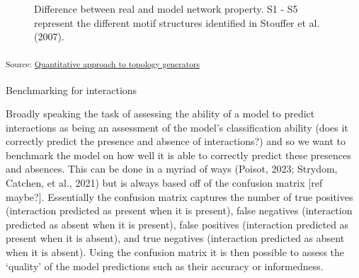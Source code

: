\documentclass[
]{article}
\makeatletter
\let\oldparagraph\paragraph
\renewcommand{\paragraph}{
    \@ifstar
      \xxxParagraphStar
      \xxxParagraphNoStar
  }
\newcommand{\xxxParagraphStar}[1]{\oldparagraph*{#1}\mbox{}}
\newcommand{\xxxParagraphNoStar}[1]{\oldparagraph{#1}\mbox{}}
\makeatother
\begin{document}
\begin{figure}[H]


\caption{\label{fig-topology}Difference between real and model network
property. S1 - S5 represent the different motif structures identified in
Stouffer et al. (2007).}

\end{figure}%

\textsubscript{Source:
\href{https://BecksLab.github.io/ms_t_is_for_topology/notebooks/model_quantitative-preview.html\#cell-fig-topology}{Quantitative
approach to topology generators}}

\paragraph{Benchmarking for
interactions}\label{benchmarking-for-interactions}

Broadly speaking the task of assessing the ability of a model to predict
interactions as being an assessment of the model's classification
ability (does it correctly predict the presence and absence of
interactions?) and so we want to benchmark the model on how well it is
able to correctly predict these presences and absences. This can be done
in a myriad of ways (Poisot, 2023; Strydom, Catchen, et al., 2021) but
is always based off of the confusion matrix {[}ref maybe?{]}.
Essentially the confusion matrix captures the number of true positives
(interaction predicted as present when it is present), false negatives
(interaction predicted as absent when it is present), false positives
(interaction predicted as present when it is absent), and true negatives
(interaction predicted as absent when it is absent). Using the confusion
matrix it is then possible to assess the `quality' of the model
predictions such as their accuracy or informedness.
\end{document}
